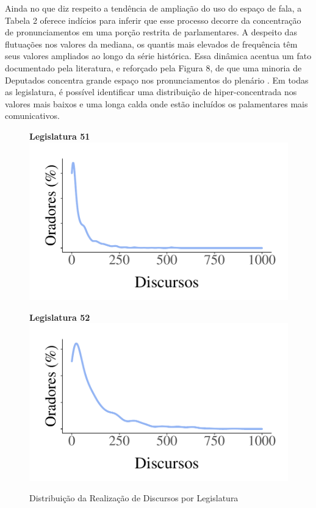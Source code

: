 \documentclass[
12pt,				%
openright,			%
twoside,			%
a4paper,			%
english,			%
french,				%
spanish,			%
brazil				%
]{abntex2}
\begin{document}
Ainda no que diz respeito a tendência de ampliação do uso do espaço de fala, a Tabela 2 oferece indícios para inferir que esse processo decorre da concentração de pronunciamentos em uma porção restrita de parlamentares. A despeito das flutuações nos valores da mediana, os quantis mais elevados de frequência têm seus valores ampliados ao longo da série histórica. Essa dinâmica acentua um fato documentado pela literatura, e reforçado pela Figura 8, de que uma minoria de Deputados concentra grande espaço nos pronunciamentos do plenário \cite{moreira2016palavra}. Em todas as legislatura, é possível identificar uma distribuição de hiper-concentrada nos valores mais baixos e uma longa calda onde estão incluídos os palamentares mais comunicativos.    

\begin{figure}[!htb]
	\caption{Distribuição da Realização de Discursos por Legislatura}
	\centering
	
	\begin{minipage}[b]{0.3\textwidth}
	\textbf{Legislatura 51}
	\label{fig:dens_legis_51}
	\centering
	\includegraphics[width=1\linewidth]{figures/dens_oradores_51}
	
	\end{minipage}
	\hspace{.05\linewidth}
	\begin{minipage}[b]{0.3\textwidth}
		\textbf{Legislatura 52}
		\label{fig:dens_legis_52}
		\centering
		\includegraphics[width=1\linewidth]{figures/dens_oradores_52}
		

\end{minipage}
\end{figure}
\end{document}
